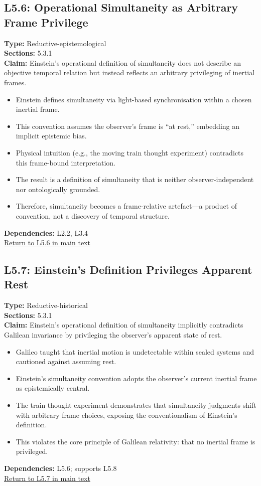 \documentclass[12pt]{book}
\newcommand{\returnlink}[1]{\hyperref[logic:#1]{Return to #1 in main text}\xspace}
\begin{document}
\subsection*{L5.6: Operational Simultaneity as Arbitrary Frame Privilege}
\label{appendix:L5.6}
\textbf{Type:} Reductive-epistemological \\
\textbf{Sections:} 5.3.1 \\
\textbf{Claim:} Einstein's operational definition of simultaneity does not describe an objective temporal relation but instead reflects an arbitrary privileging of inertial frames. 
\begin{itemize}
  \item Einstein defines simultaneity via light-based synchronisation within a chosen inertial frame.
  \item This convention assumes the observer's frame is ``at rest,'' embedding an implicit epistemic bias.
  \item Physical intuition (e.g., the moving train thought experiment) contradicts this frame-bound interpretation.
  \item The result is a definition of simultaneity that is neither observer-independent nor ontologically grounded.
  \item Therefore, simultaneity becomes a frame-relative artefact---a product of convention, not a discovery of temporal structure.
\end{itemize}
\textbf{Dependencies:} L2.2, L3.4 \\
\returnlink{L5.6}

\subsection*{L5.7: Einstein's Definition Privileges Apparent Rest}
\label{appendix:L5.7}
\textbf{Type:} Reductive-historical \\
\textbf{Sections:} 5.3.1 \\
\textbf{Claim:} Einstein's operational definition of simultaneity implicitly contradicts Galilean invariance by privileging the observer's apparent state of rest.  
\begin{itemize}
  \item Galileo taught that inertial motion is undetectable within sealed systems and cautioned against assuming rest.
  \item Einstein's simultaneity convention adopts the observer's current inertial frame as epistemically central.
  \item The train thought experiment demonstrates that simultaneity judgments shift with arbitrary frame choices, exposing the conventionalism of Einstein's definition.
  \item This violates the core principle of Galilean relativity: that no inertial frame is privileged.
\end{itemize}
\textbf{Dependencies:} L5.6; supports L5.8 \\
\returnlink{L5.7}
\end{document}
